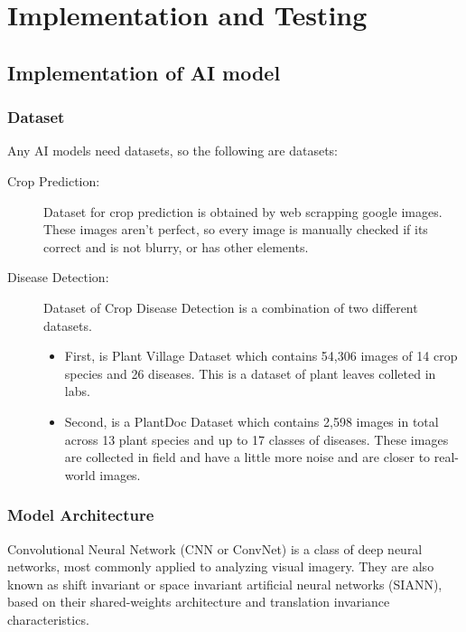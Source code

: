 \documentclass[../Report.tex]{subfiles}
\begin{document}
\chapter{Implementation and Testing} \label{chap:imp_test}

\section{Implementation of AI model}

\subsection{Dataset}
Any AI models need datasets, so the following are datasets:
\begin{description}
  \item[Crop Prediction:] Dataset for crop prediction is obtained by web scrapping google images. These images aren't perfect, so every image
  is manually checked if its correct and is not blurry, or has other elements.

  \item[Disease Detection: ] Dataset of Crop Disease Detection is a combination of two different datasets.
  \begin{itemize}
    \item First, is Plant Village Dataset\cite{disease_dataset} which contains 54,306 images of 14 crop species and 26 diseases. This is a 
    dataset of plant leaves colleted in labs.

    \item Second, is a PlantDoc Dataset\cite{plactdoc} which contains 2,598 images in total across 13 plant species and up to 17 classes 
    of diseases. These images are collected in field and have a little more noise and are closer to real-world images.
  \end{itemize}
\end{description}

\subsection{Model Architecture}
Convolutional Neural Network (CNN or ConvNet) \cite{cnn} is a class of deep neural networks, most commonly applied to analyzing visual imagery.
They are also known as shift invariant or space invariant artificial neural networks (SIANN), based on their shared-weights architecture and 
translation invariance characteristics.\par
\end{document}
